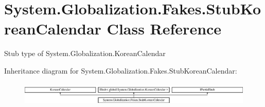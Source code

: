 \hypertarget{class_system_1_1_globalization_1_1_fakes_1_1_stub_korean_calendar}{\section{System.\-Globalization.\-Fakes.\-Stub\-Korean\-Calendar Class Reference}
\label{class_system_1_1_globalization_1_1_fakes_1_1_stub_korean_calendar}
}


Stub type of System.\-Globalization.\-Korean\-Calendar 


Inheritance diagram for System.\-Globalization.\-Fakes.\-Stub\-Korean\-Calendar\-:\begin{figure}[H]
\begin{center}
\leavevmode
\includegraphics[height=1.155831cm]{class_system_1_1_globalization_1_1_fakes_1_1_stub_korean_calendar}
\end{center}
\end{figure}
